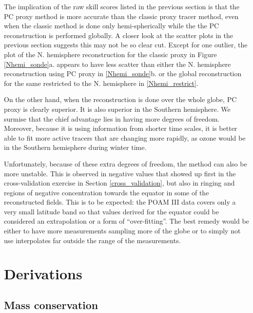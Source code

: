 \documentclass{article}
\begin{document}
The implication of the raw skill scores listed in the previous section is that the PC proxy method
is more accurate than the classic proxy tracer method, even when the classic
method is done only hemi-spherically while the the PC reconstruction is
performed globally.
A closer look at the scatter plots in the previous section suggests this may
not be so clear cut.
Except for one outlier, the plot of the N. hemisphere reconstruction for
the classic proxy in Figure \ref{Nhemi_sonde}a. appears to have less scatter than either the N. hemisphere
reconstruction using PC proxy in \ref{Nhemi_sonde}b. or the global reconstruction for the same
restricted to the N. hemisphere in \ref{Nhemi_restrict}.

On the other hand, when the reconstruction is done over the whole globe,
PC proxy is clearly superior.
It is also superior in the Southern hemisphere.
We surmise that the chief advantage lies in having more degrees of freedom.
Moreover, because it is using information from shorter time scales, it
is better able to fit more active tracers that are changing more rapidly,
as ozone would be in the Southern hemisphere during winter time.

Unfortunately, because of these extra degrees of freedom, the method can also
be more unstable.
This is observed in negative values that showed up first in the cross-validation
exercise in Section \ref{cross_validation}, but also in ringing and regions
of negative concentration towards the equator in some of the reconstructed
fields.
This is to be expected: the POAM III data covers only a very small latitude 
band so that values derived for the equator could be considered an
extrapolation or a form of ``over-fitting''.
The best remedy would be either to have more measurements sampling more of
the globe or to simply not use interpolates far outside the range of the
measurements.




\appendix

\section{Derivations}

\subsection{Mass conservation}
\end{document}
